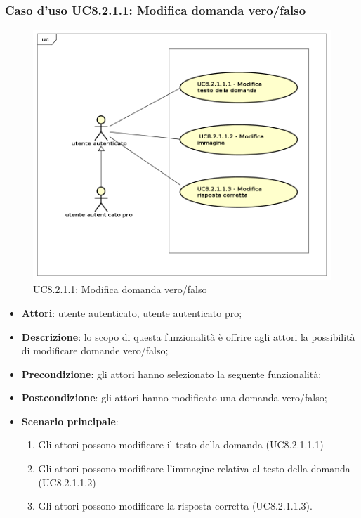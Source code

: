 \subsubsection{Caso d'uso UC8.2.1.1: Modifica domanda vero/falso}
	\label{UC8.2.1.1}
	\begin{figure}[h]
		\centering
			\includegraphics[scale=0.45,keepaspectratio]{UML/UC8_2_1_1.png}
		\caption{UC8.2.1.1: Modifica domanda vero/falso}
	\end{figure}
	\FloatBarrier
	\begin{itemize}
		\item
			\textbf{Attori}: utente autenticato, utente autenticato pro;
		\item		
			\textbf{Descrizione}: lo scopo di questa funzionalità è offrire agli attori la possibilità di modificare domande vero/falso;
		\item
			\textbf{Precondizione}: gli attori hanno selezionato la seguente funzionalità; 
		\item
			\textbf{Postcondizione}: gli attori hanno modificato una domanda vero/falso;
		\item
			\textbf{Scenario principale}:
	       		\begin{enumerate}
	       			\item
	       			Gli attori possono modificare il testo della domanda (UC8.2.1.1.1)
	       			\item
	       			Gli attori possono modificare l'immagine relativa al testo della domanda (UC8.2.1.1.2)
					\item
					Gli attori possono modificare la risposta corretta (UC8.2.1.1.3).
	 			\end{enumerate}
	\end{itemize}
	
